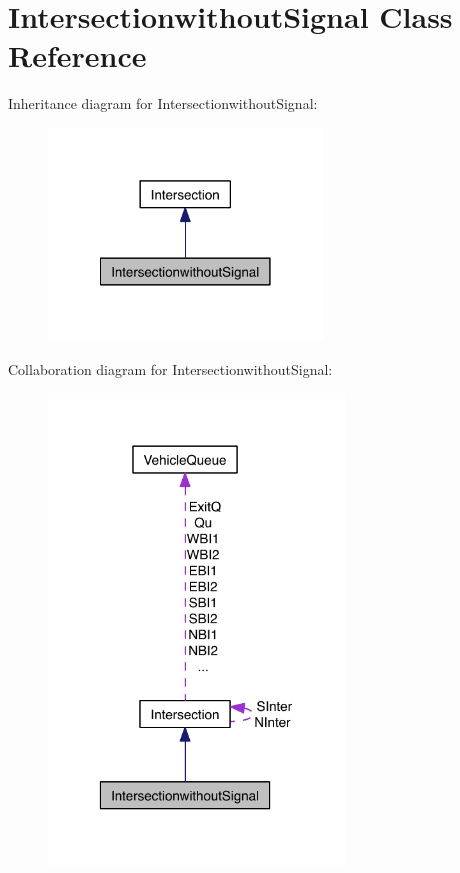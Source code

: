 \hypertarget{class_intersectionwithout_signal}{\section{Intersectionwithout\-Signal Class Reference}
\label{class_intersectionwithout_signal}
}


Inheritance diagram for Intersectionwithout\-Signal\-:\nopagebreak
\begin{figure}[H]
\begin{center}
\leavevmode
\includegraphics[width=206pt]{class_intersectionwithout_signal__inherit__graph}
\end{center}
\end{figure}


Collaboration diagram for Intersectionwithout\-Signal\-:\nopagebreak
\begin{figure}[H]
\begin{center}
\leavevmode
\includegraphics[width=223pt]{class_intersectionwithout_signal__coll__graph}
\end{center}
\end{figure}
